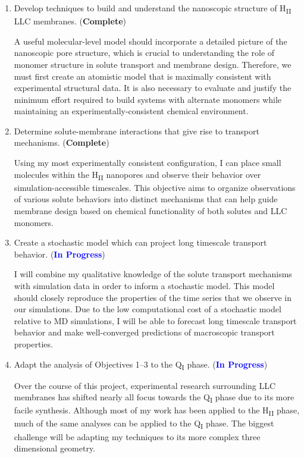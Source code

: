 \documentclass{article}
\begin{document}
  \begin{enumerate}
  
    \item Develop techniques to build and understand the nanoscopic structure
    of H\textsubscript{II} LLC membranes. (\textcolor{green!40!olive}{\textbf{Complete}})

    A useful molecular-level model should incorporate a detailed picture 
    of the nanoscopic pore structure, which is crucial to understanding
    the role of monomer structure in solute transport and membrane design.
    Therefore, we must first create an atomistic model that is maximally 
    consistent with experimental structural data. It is also necessary to
    evaluate and justify the minimum effort required to build systems with
    alternate monomers while maintaining an experimentally-consistent 
    chemical environment. 
    
    \item Determine solute-membrane interactions that give rise to
    transport mechanisms. (\textcolor{green!40!olive}{\textbf{Complete}})
    
    Using my most experimentally consistent configuration, I can place 
    small molecules within the H\textsubscript{II} nanopores and observe
    their behavior over simulation-accessible timescales. This objective 
    aims to organize observations of various solute behaviors into
    distinct mechanisms that can help guide membrane design based on 
    chemical functionality of both solutes and LLC monomers.
    
    \item Create a stochastic model which can project long timescale 
    transport behavior. (\textcolor{blue}{\textbf{In Progress}})
    
    I will combine my qualitative knowledge of the solute transport mechanisms
    with simulation data in order to inform a stochastic model. This model
    should closely reproduce the properties of the time series that we observe 
    in our simulations. Due to the low computational cost of a stochastic model
    relative to MD simulations, I will be able to forecast long timescale transport
    behavior and make well-converged predictions of macroscopic transport properties.
           
    \item Adapt the analysis of Objectives 1--3 to the Q\textsubscript{I} phase. (\textcolor{blue}{\textbf{In Progress}})
    
    Over the course of this project, experimental research surrounding
    LLC membranes has shifted nearly all focus towards the Q\textsubscript{I}
    phase due to its more facile synthesis.	Although most of my work has 
    been applied to the H\textsubscript{II} phase, much of the same analyses
    can be applied to the Q\textsubscript{I} phase. The biggest challenge will
    be adapting my techniques to its more complex three dimensional geometry.
    
  \end{enumerate}
\end{document}

